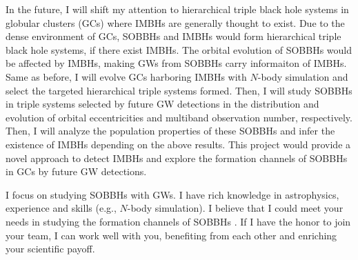 \documentclass[12pt,a4paper,sans]{article}%
\begin{document}
In the future, I will shift my attention to hierarchical triple black hole systems in globular clusters (GCs) where
IMBHs are generally thought to exist. Due to the dense environment of GCs, SOBBHs and IMBHs would form hierarchical
triple black hole systems, if there exist IMBHs. The orbital evolution of SOBBHs would be affected by IMBHs, making GWs
from SOBBHs carry informaiton of IMBHs. Same as before, I will evolve GCs harboring IMBHs with $N$-body simulation and
select the targeted hierarchical triple systems formed. Then, I will study SOBBHs in triple systems selected by future GW detections in the distribution and evolution of orbital
eccentricities and multiband observation number, respectively. Then, I will analyze the population properties of these SOBBHs and infer the existence of IMBHs depending on the above results. This project would provide a novel approach to detect IMBHs and explore the formation channels of SOBBHs in GCs by future GW detections.  

I focus on studying SOBBHs with GWs. I have rich knowledge in astrophysics, experience and skills (e.g., $N$-body simulation).  I believe that I could meet your needs in studying the formation channels of SOBBHs . If I have the honor to join your team, I can work well with you, benefiting from each other and enriching your scientific payoff. 




%
\end{document}
